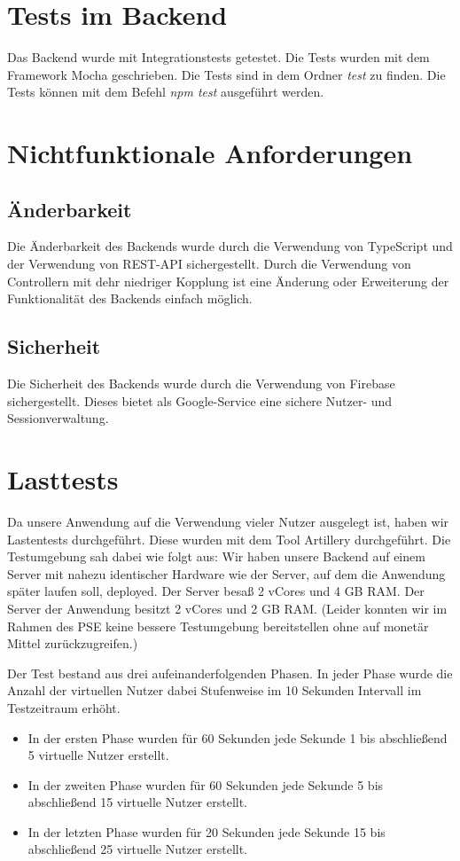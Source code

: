 \documentclass{qualitätssicherungsheft}
\begin{document}
\section{Tests im Backend}
Das Backend wurde mit Integrationstests getestet. Die Tests wurden mit dem Framework Mocha geschrieben. 
Die Tests sind in dem Ordner \textit{test} zu finden. Die Tests können mit dem Befehl \textit{npm test} ausgeführt werden.

\section{Nichtfunktionale Anforderungen}
\subsection{Änderbarkeit}
Die Änderbarkeit des Backends wurde durch die Verwendung von TypeScript und der Verwendung von REST-API sichergestellt.
Durch die Verwendung von Controllern mit dehr niedriger Kopplung ist eine Änderung oder Erweiterung der Funktionalität des Backends einfach möglich.

\subsection{Sicherheit}
Die Sicherheit des Backends wurde durch die Verwendung von Firebase sichergestellt. 
Dieses bietet als Google-Service eine sichere Nutzer- und Sessionverwaltung.

\section{Lasttests}
Da unsere Anwendung auf die Verwendung vieler Nutzer ausgelegt ist, haben wir Lastentests durchgeführt.
Diese wurden mit dem Tool Artillery durchgeführt.
Die Testumgebung sah dabei wie folgt aus:
Wir haben unsere Backend auf einem Server mit nahezu identischer Hardware wie der Server, auf dem die Anwendung später laufen soll, deployed.
Der Server besaß 2 vCores und 4 GB RAM.
Der Server der Anwendung besitzt 2 vCores und 2 GB RAM.
(Leider konnten wir im Rahmen des PSE keine bessere Testumgebung bereitstellen ohne auf monetär Mittel zurückzugreifen.)

Der Test bestand aus drei aufeinanderfolgenden Phasen.
In jeder Phase wurde die Anzahl der virtuellen Nutzer dabei Stufenweise im 10 Sekunden Intervall im Testzeitraum erhöht.
\begin{itemize}
    \item In der ersten Phase wurden für 60 Sekunden jede Sekunde 1 bis abschließend 5 virtuelle Nutzer erstellt.
    \item In der zweiten Phase wurden für 60 Sekunden jede Sekunde 5 bis abschließend 15 virtuelle Nutzer erstellt.
    \item In der letzten Phase wurden für 20 Sekunden jede Sekunde 15 bis abschließend 25 virtuelle Nutzer erstellt.
\end{itemize}
\end{document}
